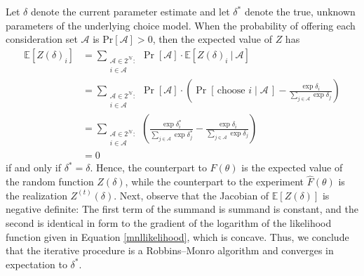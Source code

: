 \documentclass[preprint,12pt,authoryear]{elsarticle}
\begin{document}
Let $\delta$ denote the current parameter estimate and let $\delta^*$ denote the true, unknown parameters of the underlying choice model. When the probability of offering each consideration set $\mathcal{A}$ is $\operatorname{Pr[\mathcal{A}]} > 0$, then the expected value of $Z$ has
\begin{align}
\mathbb{E}\left[Z(\delta)_i \right] &= \sum_{\substack{\mathcal{A} \in 2^{\mathcal{N}}: \\ i \in \mathcal{A}}}\operatorname{Pr}\left[\mathcal{A}\right] \cdot \mathbb{E}\left[Z(\delta)_i~|~\mathcal{A}\right] \\
&=   \sum_{\substack{\mathcal{A} \in 2^{\mathcal{N}}: \\ i \in \mathcal{A}}}\operatorname{Pr}\left[\mathcal{A}\right] \cdot \left(\operatorname{Pr}\left[\,\text{choose } i\;|\;\mathcal{A}\,\right] - \frac{\exp \delta_i}{\sum_{j\in \mathcal{A}} \exp \delta_j} \right) \\
&= \sum_{\substack{\mathcal{A} \in 2^{\mathcal{N}}: \\ i \in \mathcal{A}}}\left(\frac{\exp  \delta_i^*}{\sum_{j\in \mathcal{A}} \exp \delta_j^*} - \frac{\exp \delta_i}{\sum_{j\in \mathcal{A}} \exp \delta_j} \right) \\
&= 0
\end{align}
if and only if $\delta^* = \delta$. Hence, the counterpart to $F(\theta)$ is the expected value of the random function $Z(\delta)$, while the counterpart to the experiment $\hat F(\theta)$ is the realization $Z^{(t)}(\delta)$. Next, observe that the Jacobian of $\mathbb{E}\left[Z(\delta) \right]$ is negative definite: The first term of the summand is summand is constant, and the second is identical in form to the gradient of the logarithm of the likelihood function given in Equation \eqref{mnllikelihood}, which is concave. Thus, we conclude that the iterative procedure is a Robbins--Monro algorithm and converges in expectation to $\delta^*$. 
\end{document}
